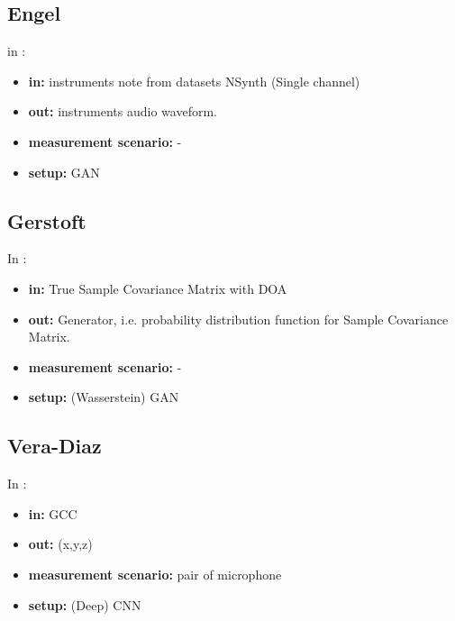 \documentclass{article}
\begin{document}
\subsection{Engel}

in \cite{engel2019gansynth}:

\begin{itemize}
    \item \textbf{in:} instruments note from datasets NSynth (Single channel)
    \item \textbf{out:} instruments audio waveform.
    \item \textbf{measurement scenario:} - 
    \item \textbf{setup:} GAN
\end{itemize}

\subsection{Gerstoft}

In \cite{gerstoft2020parametric}:

\begin{itemize}
    \item \textbf{in:} True Sample Covariance Matrix with DOA
    \item \textbf{out:} Generator, i.e. probability distribution function for Sample Covariance Matrix.
    \item \textbf{measurement scenario:} -
    \item \textbf{setup:} (Wasserstein) GAN
\end{itemize}

\subsection{Vera-Diaz}

In \cite{vera2021acoustic}:

\begin{itemize}
    \item \textbf{in:} GCC
    \item \textbf{out:} (x,y,z)
    \item \textbf{measurement scenario:} pair of microphone
    \item \textbf{setup:} (Deep) CNN
\end{itemize}





%

 
\end{document}
